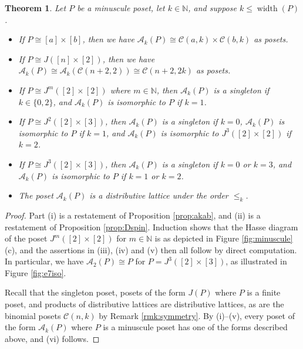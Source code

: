 \documentclass[11pt]{amsart}
\theoremstyle{plain}
\newtheorem{theorem}{Theorem}[section]
\theoremstyle{definition}
\theoremstyle{remark}
\numberwithin{equation}{section}
\newcommand{\N}{\mathbb{N}}
\newcommand{\cala}{\mathcal{A}}
\newcommand{\calc}{\mathcal{C}}
\newcommand{\akp}{\mathcal{A}_k(P)}
\DeclareMathOperator{\width}{\mathrm{width}}
\begin{document}
\begin{theorem}\label{thm:dist}
Let $P$ be a minuscule poset, let $k\in \N$, and suppose $k\le
\width(P)$.
\begin{itemize}
    \item[{\rm (i)}]{If $P \cong [a] \times [b]$, then we have $\cala_k(P) \cong
         \calc(a, k) \times \calc(b, k)$ as posets.}
     \item[{\rm (ii)}]{If $P \cong J([n] \times [2])$, then we have
      $\cala_k(P)\cong \cala_k(\calc(n+2,2))\cong \calc(n+2,2k)$ as posets.}
  \item[{\rm (iii)}]{If $P \cong J^m([2]\times [2])$ where $m\in \N$, then
      $\cala_k(P)$ is a singleton if $k \in \{0, 2\}$, and $\cala_k(P)$ is
  isomorphic to $P$ if $k = 1$.}
 \item[{\rm (iv)}]{If $P \cong J^2([2] \times [3])$, then $\cala_k(P)$ is a
      singleton if $k = 0$, $\cala_k(P)$ is isomorphic to $P$ if $k = 1$, and
  $\cala_k(P)$ is isomorphic to $J^3([2] \times [2])$ if $k = 2$.}
\item[{\rm (v)}]{If $P \cong J^3([2] \times [3])$, then $\cala_k(P)$ is a
     singleton if $k = 0$ or $k = 3$, and $\cala_k(P)$ is isomorphic to $P$ if
 $k = 1$ or $k = 2$.}
 \item[{\rm (vi)}]{The poset $\akp$ is a distributive lattice under the order
      $\le_k$.}
\end{itemize}
\end{theorem}

\begin{proof}
Part (i) is a restatement of Proposition \ref{prop:akab}, and (ii) is a
restatement of Proposition \ref{prop:Dspin}. Induction shows that the Hasse
diagram of the poset $J^m([2]\times [2])$ for $m\in \N$ is as depicted in Figure
\ref{fig:minuscule} (c), and the assertions in (iii), (iv) and (v) then all
follow by direct computation. In particular, we have $\cala_2(P)\cong P$ for
$P=J^3([2]\times[3])$, as illustrated in Figure \ref{fig:e7iso}.

Recall that the singleton poset, posets of the form $J(P)$ where $P$ is a finite
poset, and products of distributive lattices are distributive lattices, as are
the binomial posets $\calc(n,k)$ by Remark \ref{rmk:symmetry}.  By (i)--(v), every
poset of the form $\cala_k(P)$ where $P$ is a minuscule poset has one of the
forms described above, and (vi) follows.
\end{proof}
\end{document}
